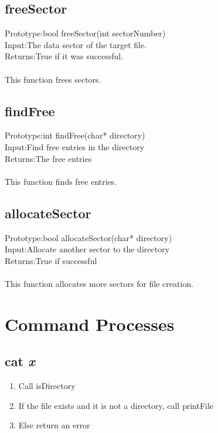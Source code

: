 \documentclass[a4paper]{article}
\begin{document}
\subsection{freeSector}
Prototype:\hspace{0.2cm}bool freeSector(int sectorNumber)\\
Input:\hspace{0.88cm}The data sector of the target file.\\
Returns:\hspace{0.51cm}True if it was successful.\\\\
This function frees sectors.

\subsection{findFree}
Prototype:\hspace{0.2cm}int findFree(char* directory)\\
Input:\hspace{0.88cm}Find free entries in the directory\\
Returns:\hspace{0.51cm}The free entries\\\\
This function finds free entries.

\subsection{allocateSector}
Prototype:\hspace{0.2cm}bool allocateSector(char* directory)\\
Input:\hspace{0.88cm}Allocate another sector to the directory\\
Returns:\hspace{0.51cm}True if successful\\\\
This function allocates more sectors for file creation.

\section{Command Processes}


\subsection{cat \textit{x}}
\begin{enumerate}
\item Call isDirectory
\item If the file exists and it is not a directory, call printFile
\item Else return an error
\end{enumerate}
\end{document}

